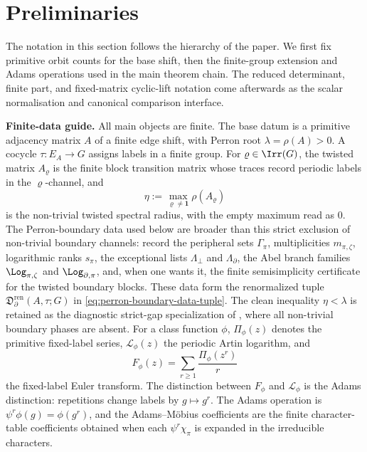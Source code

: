 \section{Preliminaries}\label{sec:preliminaries}

The notation in this section follows the hierarchy of the paper. We
first fix primitive orbit counts for the base shift, then the
finite-group extension and Adams operations used in the main theorem
chain. The reduced determinant, finite part, and fixed-matrix cyclic-lift
notation come afterwards as the scalar normalisation and canonical comparison
interface.

\medskip
\noindent\textbf{Finite-data guide.}
All main objects are finite.  The base datum is a primitive adjacency
matrix \(A\) of a finite edge shift, with Perron root
\(\lambda=\rho(A)>0\).  A cocycle \(\tau:E_A\to G\) assigns labels in a
finite group.  For \(\varrho\in\Irr(G)\), the twisted matrix
\(A_\varrho\) is the finite block transition matrix whose traces record
periodic labels in the \(\varrho\)-channel, and
\[
  \eta:=\max_{\varrho\ne\mathbf1}\rho(A_\varrho)
\]
is the non-trivial twisted spectral radius, with the empty maximum read
as \(0\).  The Perron-boundary data used below are broader than this
strict exclusion of non-trivial boundary channels:
record the peripheral sets \(\Gamma_\pi\), multiplicities
\(m_{\pi,\zeta}\), logarithmic ranks \(s_\pi\), the exceptional lists
\(\Lambda_\perp\) and \(\Lambda_\partial\), the Abel branch families
\(\Log_{\pi,\zeta}\) and \(\Log_{\partial,\pi}\), and, when one wants it,
the finite semisimplicity certificate for the twisted boundary blocks.
These data form the renormalized tuple
\(\mathfrak D_{\partial}^{\mathrm{ren}}(A,\tau;G)\) in
\eqref{eq:perron-boundary-data-tuple}.  The clean inequality
\(\eta<\lambda\) is retained as the diagnostic strict-gap specialization of
, where all non-trivial boundary phases
are absent.  For a class function \(\phi\),
\(\Pi_\phi(z)\) denotes the primitive fixed-label series,
\(\mathcal L_\phi(z)\) the periodic Artin logarithm, and
\[
  F_\phi(z)=\sum_{r\ge1}\frac{\Pi_\phi(z^r)}{r}
\]
the fixed-label Euler transform.  The distinction between
\(F_\phi\) and \(\mathcal L_\phi\) is the Adams distinction: repetitions
change labels by \(g\mapsto g^r\).  The Adams operation is
\(\psi^r\phi(g)=\phi(g^r)\), and the Adams--M\"obius coefficients are the
finite character-table coefficients obtained when each
\(\psi^r\chi_\pi\) is expanded in the irreducible characters.


